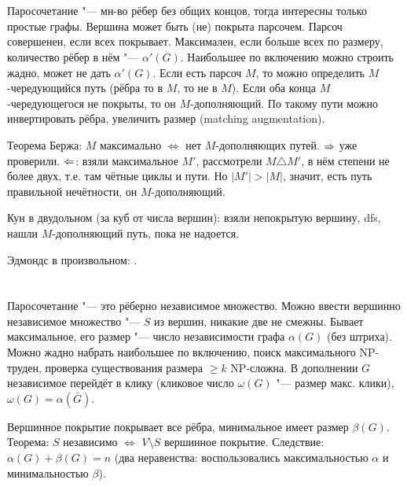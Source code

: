 \section{} %
	Паросочетание "--- мн-во рёбер без общих концов, тогда интересны только простые графы.
	Вершина может быть (не) покрыта парсочем.
	Парсоч совершенен, если всех покрывает.
	Максимален, если больше всех по размеру, количество рёбер в нём "--- $\alpha'(G)$.
	Наибольшее по включению можно строить жадно, может не дать $\alpha'(G)$.
	Если есть парсоч $M$, то можно определить $M$-чередующийся путь (рёбра то в $M$, то не в $M$).
	Если оба конца $M$-чередующегося не покрыты, то он $M$-дополняющий.
	По такому пути можно инвертировать рёбра, увеличить размер (matching augmentation).

	Теорема Бержа: $M$ максимально $\iff$ нет $M$-дополняющих путей.
	$\Rightarrow$ уже проверили.
	$\Leftarrow$: взяли максимальное $M'$, рассмотрели $M \triangle M'$, в нём степени не более двух,
	т.е. там чётные циклы и пути.
	Но $|M'|>|M|$, значит, есть путь правильной нечётности, он $M$-дополняющий.

	Кун в двудольном (за куб от числа вершин): взяли непокрытую вершину, dfs, нашли $M$-дополняющий путь, пока не надоется.
	\TODO

	Эдмондс в произвольном: \TODO.

\section{} %
	Паросочетание "--- это рёберно независимое множество.
	Можно ввести вершинно независимое множество "--- $S$ из вершин, никакие две не смежны.
	Бывает максимальное, его размер "--- число независимости графа $\alpha(G)$ (без штриха).
	Можно жадно набрать наибольшее по включению, поиск максимального NP-труден,
	проверка существования размера $\ge k$ NP-сложна.
	В дополнении $G$ независимое перейдёт в клику (кликовое число $\omega(G)$ "--- размер макс. клики),
	$\omega(G)=\alpha(\bar G)$.

	Вершинное покрытие покрывает все рёбра, минимальное имеет размер $\beta(G)$.
	Теорема: $S$ независимо $\iff$ $V\setminus S$ вершинное покрытие.
	Следствие: $\alpha(G)+\beta(G)=n$ (два неравенства: воспользовались максимальностью $\alpha$
	и минимальностью $\beta$).

